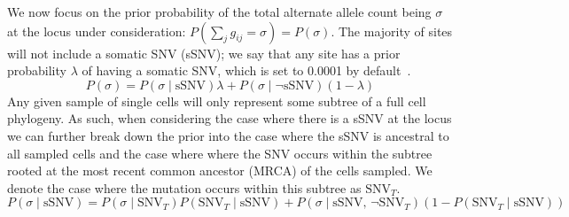 \documentclass[../../main.tex]{subfiles}
\begin{document}
We now focus on the prior probability of the total alternate allele count being $\sigma$ at the locus under consideration: $P(\sum_j g_{ij}=\sigma)=P(\sigma)$. The majority of sites will not include a somatic SNV (sSNV); we say that any site has a prior probability $\lambda$ of having a somatic SNV, which is set to 0.0001 by default~\cite{monovar, sciphi}. %
%
\begin{equation} \label{eq:overallprior}
P(\sigma)=P(\sigma\mid\text{sSNV})\lambda+P(\sigma\mid\neg\text{sSNV})(1-\lambda)
\end{equation}
Any given sample of single cells will only represent some subtree of a full cell phylogeny. As such, when considering the case where there is a sSNV at the locus we can further break down the prior into the case where the sSNV is ancestral to all sampled cells and the case where where the SNV occurs within the subtree rooted at the most recent common ancestor (MRCA) of the cells sampled. We denote the case where the mutation occurs within this subtree as $\text{SNV}_T$.
\begin{equation} \label{eq:somaticsnv}
P(\sigma\mid\text{sSNV})=P(\sigma\mid \text{SNV}_T)P(\text{SNV}_T\mid \text{sSNV})+P(\sigma\mid \text{sSNV},\,\neg\text{SNV}_T)(1-P(\text{SNV}_T\mid \text{sSNV}))
\end{equation}
\end{document}
